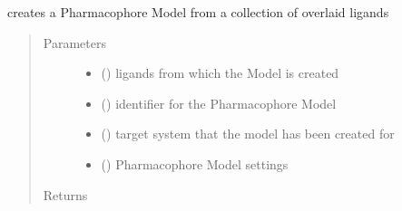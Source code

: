 \documentclass[letterpaper,10pt,english]{sphinxmanual}
\begin{document}
\begin{fulllineitems}
\begin{fulllineitems}
\label{\detokenize{hs_pharmacophore_api:hotspots.hs_pharmacophore.PharmacophoreModel.from_ligands}}
creates a Pharmacophore Model from a collection of overlaid ligands
\begin{quote}\begin{description}
\item[{Parameters}] \leavevmode\begin{itemize}
\item {} 
 (\sphinxstyleliteralemphasis{\sphinxupquote{,}}) \textendash{} ligands from which the Model is created

\item {} 
 () \textendash{} identifier for the Pharmacophore Model

\item {} 
 () \textendash{} target system that the model has been created for

\item {} 
 ({\hyperref[\detokenize{hs_pharmacophore_api:hotspots.hs_pharmacophore.PharmacophoreModel.Settings}]{}}) \textendash{} Pharmacophore Model settings

\end{itemize}

\item[{Returns}] \leavevmode
{\hyperref[\detokenize{hs_pharmacophore_api:hotspots.hs_pharmacophore.PharmacophoreModel}]{}}

\end{description}\end{quote}


\end{fulllineitems}
\end{fulllineitems}
\end{document}
